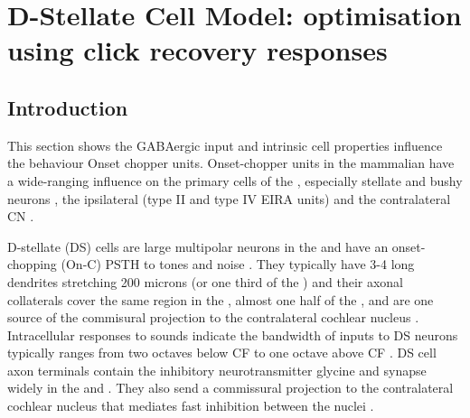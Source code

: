 
\graphicspath{{/media/data/Work/cnstellate/DS_ClickRecovery/}{/media/data/Work/Responses/}{../figures/}{./gfx/}}
\section[DS Cell Model]{D-Stellate Cell Model: optimisation using click recovery
  responses}
\label{sec:d-stellate-cell-model}

\subsection{Introduction}

This section shows the GABAergic input and intrinsic cell properties influence
the behaviour Onset chopper units.  Onset-chopper units in the mammalian \VCN
have a wide-ranging influence on the primary cells of the \VCN, especially
stellate and bushy neurons \citep{RhodeSmithEtAl:1983}, the ipsilateral \DCN
(type II and type IV EIRA units) and the contra\-lateral CN
\citep{NeedhamPaolini:2007}.


  
D-stellate (DS) cells are large multipolar neurons in the \VCN and have an
onset-chopping (On-C) PSTH to tones and noise \citep{SmithRhode:1989,
  NeedhamPaolini:2006}.  They typically have 3-4 long dendrites stretching 200
microns (or one third of the \VCN) and their axonal collaterals cover the same
region in the \VCN, almost one half of the \DCN, and are one source of the
commisural projection to the contralateral cochlear nucleus
\citep{Cant:1992,Cant:1981,SchofieldCant:1996,CantBenson:2003,
  NeedhamPaolini:2007, PaoliniClark:1999}. Intracellular responses to sounds
indicate the bandwidth of inputs to DS neurons typically ranges from two octaves
below CF to one octave above CF \citep{PalmerJiangEtAl:1996,
  JiangPalmerEtAl:1996, PaoliniClark:1999}. DS cell axon terminals contain the
inhibitory neurotransmitter glycine and synapse widely in the \VCN and \DCN\@.
They also send a commissural projection to the contralateral cochlear nucleus
that mediates fast inhibition between the nuclei \citep{NeedhamPaolini:2003,
  NeedhamPaolini:2006, Oertel:1997}.


